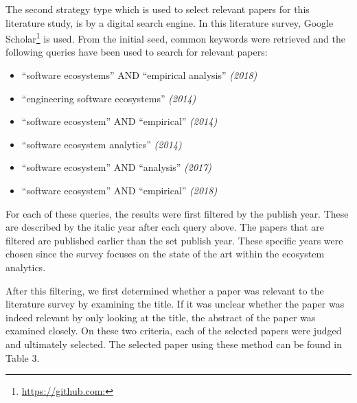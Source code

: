 \documentclass[]{book}
\providecommand{\tightlist}{%
  \setlength{\itemsep}{0pt}\setlength{\parskip}{0pt}}
\let\rmarkdownfootnote\footnote%
\def\footnote{\protect\rmarkdownfootnote}
\begin{document}
The second strategy type which is used to select relevant papers for
this literature study, is by a digital search engine. In this literature
survey, Google Scholar\footnote{\url{https://github.com:}} is used. From
the initial seed, common keywords were retrieved and the following
queries have been used to search for relevant papers:

\begin{itemize}
\tightlist
\item
  ``software ecosystems'' AND ``empirical analysis'' \emph{(2018)}
\item
  ``engineering software ecosystems'' \emph{(2014)}
\item
  ``software ecosystem'' AND ``empirical'' \emph{(2014)}
\item
  ``software ecosystem analytics'' \emph{(2014)}
\item
  ``software ecosystem'' AND ``analysis'' \emph{(2017)}
\item
  ``software ecosystem'' AND ``empirical'' \emph{(2018)}
\end{itemize}

For each of these queries, the results were first filtered by the
publish year. These are described by the italic year after each query
above. The papers that are filtered are published earlier than the set
publish year. These specific years were chosen since the survey focuses
on the state of the art within the ecosystem analytics.

After this filtering, we first determined whether a paper was relevant
to the literature survey by examining the title. If it was unclear
whether the paper was indeed relevant by only looking at the title, the
abstract of the paper was examined closely. On these two criteria, each
of the selected papers were judged and ultimately selected. The selected
paper using these method can be found in Table 3.
\end{document}
